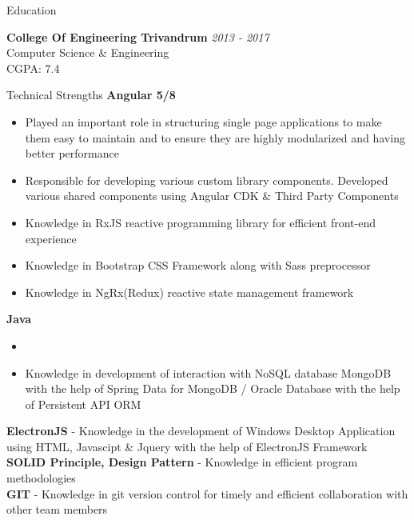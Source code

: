 \documentclass{resume} %
\begin{document}

\begin{rSection}{Education}

{\bf College Of Engineering Trivandrum} \hfill {\em 2013 - 2017} 
\\ Computer Science \& Engineering
\\ CGPA: 7.4



\end{rSection}




\begin{rSection}{Technical Strengths}
{\bf Angular 5/8}
\begin{itemize}
    \item Played an important role in structuring single page applications to make them easy to maintain and to ensure they are highly modularized and having better performance
    \item Responsible for developing various custom library components. Developed various shared components using Angular CDK \& Third Party Components
    \item Knowledge in RxJS reactive programming library for efficient front-end experience
    \item Knowledge in Bootstrap CSS Framework along with Sass preprocessor
   \item Knowledge in NgRx(Redux) reactive state management framework
\end{itemize}

{\bf Java}
\begin{itemize}
    \item 
    \item Knowledge in  development of interaction with NoSQL database MongoDB with the help of Spring Data for MongoDB / Oracle Database with the help of Persistent API ORM
\end{itemize}
{\bf ElectronJS} - {Knowledge in the development of Windows Desktop Application using HTML, Javascipt \& Jquery with the help of ElectronJS Framework }
        \newline
{\bf SOLID Principle, Design Pattern} - {Knowledge in efficient program methodologies}
\\
{\bf GIT } - {Knowledge in git version control for timely and efficient collaboration with other team members }
\end{rSection}
\end{document}
